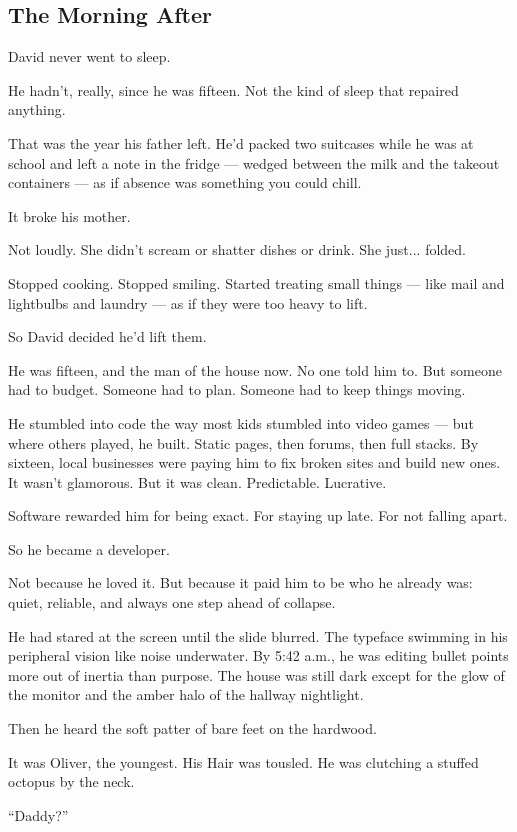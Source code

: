 \subsection{The Morning After}

David never went to sleep.

He hadn’t, really, since he was fifteen. Not the kind of sleep that repaired anything.

That was the year his father left. He’d packed two suitcases while he was at school and
left a note in the fridge — wedged between the milk and the takeout containers —
as if absence was something you could chill.

It broke his mother.

Not loudly.
She didn’t scream or shatter dishes or drink.
She just... folded.

Stopped cooking.
Stopped smiling.
Started treating small things — like mail and lightbulbs and laundry — as if they were too heavy to lift.

So David decided he’d lift them.

He was fifteen, and the man of the house now.
No one told him to. But someone had to budget. Someone had to plan. Someone had to keep things moving.

He stumbled into code the way most kids stumbled into video games —
but where others played, he built.
Static pages, then forums, then full stacks.
By sixteen, local businesses were paying him to fix broken sites and build new ones.
It wasn’t glamorous. But it was clean. Predictable. Lucrative.

Software rewarded him for being exact.
For staying up late.
For not falling apart.

So he became a developer.

Not because he loved it.
But because it paid him to be who he already was:
quiet, reliable, and always one step ahead of collapse.

He had stared at the screen until the slide blurred. The typeface swimming in his peripheral vision 
like noise underwater. By 5:42 a.m., he was editing bullet points more out of inertia than purpose. 
The house was still dark except for the glow of the monitor and the amber halo of the hallway nightlight.

Then he heard the soft patter of bare feet on the hardwood.

It was Oliver, the youngest. His Hair was tousled. He was clutching a stuffed octopus by the neck.

``Daddy?''

